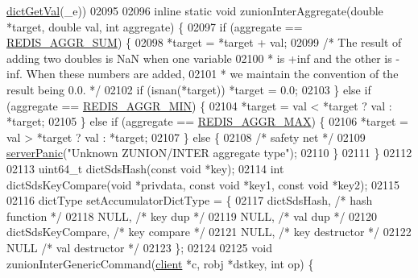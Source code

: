\begin{DoxyCode}
      \hyperlink{dict_8h_ae8d2cc391873b2bea2b87c4f80f43120}{dictGetVal}\textcolor{preprocessor}{(}\textcolor{preprocessor}{\_e}\textcolor{preprocessor}{)}\textcolor{preprocessor}{)}
02095 
02096 \textcolor{keyword}{inline} \textcolor{keyword}{static} \textcolor{keywordtype}{void} zunionInterAggregate(\textcolor{keywordtype}{double} *target, \textcolor{keywordtype}{double} val, \textcolor{keywordtype}{int} aggregate) \{
02097     \textcolor{keywordflow}{if} (aggregate == \hyperlink{t__zset_8c_a68af64a03a67d45bee92a8713f640ce8}{REDIS\_AGGR\_SUM}) \{
02098         *target = *target + val;
02099         \textcolor{comment}{/* The result of adding two doubles is NaN when one variable}
02100 \textcolor{comment}{         * is +inf and the other is -inf. When these numbers are added,}
02101 \textcolor{comment}{         * we maintain the convention of the result being 0.0. */}
02102         \textcolor{keywordflow}{if} (isnan(*target)) *target = 0.0;
02103     \} \textcolor{keywordflow}{else} \textcolor{keywordflow}{if} (aggregate == \hyperlink{t__zset_8c_a2da62788a46c712881bbcf613a98b3a9}{REDIS\_AGGR\_MIN}) \{
02104         *target = val < *target ? val : *target;
02105     \} \textcolor{keywordflow}{else} \textcolor{keywordflow}{if} (aggregate == \hyperlink{t__zset_8c_a53a2a589750e7720bfc8feb9c1c4ec51}{REDIS\_AGGR\_MAX}) \{
02106         *target = val > *target ? val : *target;
02107     \} \textcolor{keywordflow}{else} \{
02108         \textcolor{comment}{/* safety net */}
02109         \hyperlink{server_8h_a11cc378e7778a830b41240578de3b204}{serverPanic}(\textcolor{stringliteral}{"Unknown ZUNION/INTER aggregate type"});
02110     \}
02111 \}
02112 
02113 uint64\_t dictSdsHash(\textcolor{keyword}{const} \textcolor{keywordtype}{void} *key);
02114 \textcolor{keywordtype}{int} dictSdsKeyCompare(\textcolor{keywordtype}{void} *privdata, \textcolor{keyword}{const} \textcolor{keywordtype}{void} *key1, \textcolor{keyword}{const} \textcolor{keywordtype}{void} *key2);
02115 
02116 dictType setAccumulatorDictType = \{
02117     dictSdsHash,               \textcolor{comment}{/* hash function */}
02118     NULL,                      \textcolor{comment}{/* key dup */}
02119     NULL,                      \textcolor{comment}{/* val dup */}
02120     dictSdsKeyCompare,         \textcolor{comment}{/* key compare */}
02121     NULL,                      \textcolor{comment}{/* key destructor */}
02122     NULL                       \textcolor{comment}{/* val destructor */}
02123 \};
02124 
02125 \textcolor{keywordtype}{void} zunionInterGenericCommand(\hyperlink{structclient}{client} *c, robj *dstkey, \textcolor{keywordtype}{int} op) \{

\end{DoxyCode}
